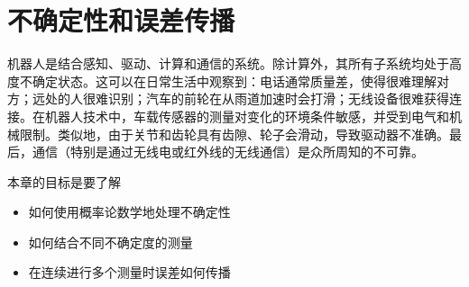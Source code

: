 \chapter{不确定性和误差传播}
\label{chap:uncertainty}



机器人是结合感知、驱动、计算和通信的系统。除计算外，其所有子系统均处于高度不确定状态。这可以在日常生活中观察到：电话通常质量差，使得很难理解对方；远处的人很难识别；汽车的前轮在从雨道加速时会打滑；无线设备很难获得连接。在机器人技术中，车载传感器的测量对变化的环境条件敏感，并受到电气和机械限制。类似地，由于关节和齿轮具有齿隙、轮子会滑动，导致驱动器不准确。最后，通信（特别是通过无线电或红外线的无线通信）是众所周知的不可靠。

本章的目标是要了解

\begin{itemize}

\item 如何使用概率论数学地处理不确定性
\item 如何结合不同不确定度的测量
\item 在连续进行多个测量时误差如何传播
\end{itemize}

